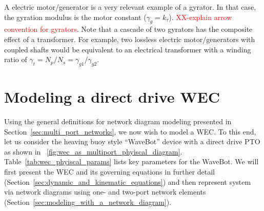 \documentclass[lettersize,journal]{IEEEtran}
\newcommand{\rc}[1]{\textcolor{red}{#1}}
\begin{document}
\noindent{}A electric motor/generator is a very relevant example of a gyrator.
In that case, the gyration modulus is the motor constant ($\gamma_g=k_\tau$).
\rc{XX-explain arrow convention for gyrators}.
Note that a cascade of two gyrators has the composite effect of a transformer.
For example, two lossless electric motor/generators with coupled shafts would be equivalent to an electrical transformer with a winding ratio of $\gamma_t=N_p/N_s=\gamma_{g1}/\gamma_{g2}$.

\section{Modeling a direct drive WEC}\label{sec:modeling_a_direct_drive_wec}
Using the general definitions for network diagram modeling presented in Section~\ref{sec:multi_port_networks}, we now wish to model a WEC.
To this end, let us consider the heaving buoy style ``WaveBot'' device with a direct drive PTO as shown in \figurename~\ref{fig:wec_as_multiport_phyiscal_diagram}.
Table~\ref{tab:wec_phyiscal_params} lists key parameters for the WaveBot.
We will first present the WEC and its governing equations in further detail (Section~\ref{sec:dynamic_and_kinematic_equations}) and then represent system via network diagrams using one- and two-port network elements (Section~\ref{sec:modeling_with_a_network_diagram}).
\end{document}
